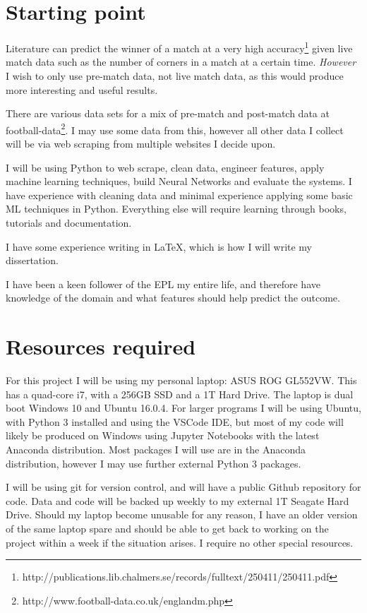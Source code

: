 \documentclass[12pt,a4paper,twoside]{article}
\begin{document}
\section*{Starting point}

Literature can predict the winner of a match at a very high accuracy\footnote{http://publications.lib.chalmers.se/records/fulltext/250411/250411.pdf} given live match data such as the number of corners in a match at a certain time. \textit{However} I wish to only use pre-match data, not live match data, as this would produce more interesting and useful results. 

There are various data sets for a mix of pre-match and post-match data at football-data\footnote{http://www.football-data.co.uk/englandm.php}. I may use some data from this, however all other data I collect will be via web scraping from multiple websites I decide upon.

I will be using Python to web scrape, clean data, engineer features, apply machine learning techniques, build Neural Networks and evaluate the systems. I have experience with cleaning data and minimal experience applying some basic ML techniques in Python. Everything else will require learning through books, tutorials and documentation.

I have some experience writing in \LaTeX, which is how I will write my dissertation.

I have been a keen follower of the EPL my entire life, and therefore have knowledge of the domain and what features should help predict the outcome.

\section*{Resources required}

For this project I will be using my personal laptop: ASUS ROG GL552VW. This has a quad-core i7, with a 256GB SSD and a 1T Hard Drive. The laptop is dual boot Windows 10 and Ubuntu 16.0.4. For larger programs I will be using Ubuntu, with Python 3 installed and using the VSCode IDE, but most of my code will likely be produced on Windows using Jupyter Notebooks with the latest Anaconda distribution. Most packages I will use are in the Anaconda distribution, however I may use further external Python 3 packages.

I will be using git for version control, and will have a public Github repository for code. Data and code will be backed up weekly to my external 1T Seagate Hard Drive. Should my laptop become unusable for any reason, I have an older version of the same laptop spare and should be able to get back to working on the project within a week if the situation arises. I require no other special resources.
\end{document}
